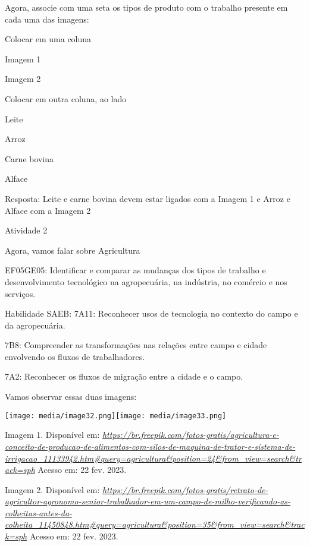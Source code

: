 Agora, associe com uma seta os tipos de produto com o trabalho presente
em cada uma das imagens:

Colocar em uma coluna

Imagem 1

Imagem 2

Colocar em outra coluna, ao lado

Leite

Arroz

Carne bovina

Alface

Resposta: Leite e carne bovina devem estar ligados com a Imagem 1 e
Arroz e Alface com a Imagem 2

Atividade 2

Agora, vamos falar sobre Agricultura

EF05GE05: Identificar e comparar as mudanças dos tipos de trabalho e
desenvolvimento tecnológico na agropecuária, na indústria, no comércio e
nos serviços.

Habilidade SAEB: 7A11: Reconhecer usos de tecnologia no contexto do
campo e da agropecuária.

7B8: Compreender as transformações nas relações entre campo e cidade
envolvendo os fluxos de trabalhadores.

7A2: Reconhecer os fluxos de migração entre a cidade e o campo.

Vamos observar essas duas imagens:

\texttt{[image: media/image32.png]}\texttt{[image: media/image33.png]}

Imagem 1. Disponível em:
\href{https://br.freepik.com/fotos-gratis/agricultura-e-conceito-de-producao-de-alimentos-com-silos-de-maquina-de-trator-e-sistema-de-irrigacao_11133942.htm\#query=agricultura\&position=24\&from_view=search\&track=sph}{\emph{https://br.freepik.com/fotos-gratis/agricultura-e-conceito-de-producao-de-alimentos-com-silos-de-maquina-de-trator-e-sistema-de-irrigacao\_11133942.htm\#query=agricultura\&position=24\&from\_view=search\&track=sph}}
Acesso em: 22 fev. 2023.

Imagem 2. Disponível em:
\href{https://br.freepik.com/fotos-gratis/retrato-de-agricultor-agronomo-senior-trabalhador-em-um-campo-de-milho-verificando-as-colheitas-antes-da-colheita_11450848.htm\#query=agricultura\&position=35\&from_view=search\&track=sph}{\emph{https://br.freepik.com/fotos-gratis/retrato-de-agricultor-agronomo-senior-trabalhador-em-um-campo-de-milho-verificando-as-colheitas-antes-da-colheita\_11450848.htm\#query=agricultura\&position=35\&from\_view=search\&track=sph}}
Acesso em: 22 fev. 2023.


